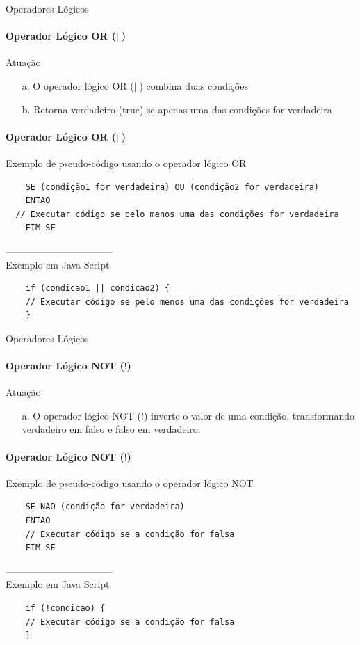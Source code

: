 \documentclass[13pt, xcolor={dvipsnames,svgnames}, portuguese]{beamer}
\begin{document}
\begin{frame}{Operadores Lógicos}
\framesubtitle{Operador Lógico OR ($||$)}
	\begin{block}{Atuação}
		\begin{itemize}
		  \item[a. ] O operador lógico OR ($||$) combina duas condições 
		  \pause
		  \item[b. ] Retorna verdadeiro (true) se apenas uma das condições for verdadeira
		\end{itemize}
	\end{block}	
\end{frame}

\begin{frame}[fragile]
\framesubtitle{Operador Lógico OR ($||$)}
 Exemplo de pseudo-código usando o operador lógico OR
	\begin{verbatim}
	SE (condição1 for verdadeira) OU (condição2 for verdadeira)
	ENTAO
  // Executar código se pelo menos uma das condições for verdadeira
	FIM SE
	\end{verbatim}
	---------------------------------\\
	Exemplo em Java Script
	\begin{verbatim}
	if (condicao1 || condicao2) {
  	// Executar código se pelo menos uma das condições for verdadeira
	}
	\end{verbatim}
\end{frame}

\begin{frame}{Operadores Lógicos}
\framesubtitle{Operador Lógico NOT ($!$)}
	\begin{block}{Atuação}
		\begin{itemize}
		  \item[a. ] O operador lógico NOT ($!$) inverte o valor de uma condição, transformando verdadeiro em falso e falso em verdadeiro. 
		\end{itemize}
	\end{block}	
\end{frame}

\begin{frame}[fragile]
\framesubtitle{Operador Lógico NOT ($!$)}
 Exemplo de pseudo-código usando o operador lógico NOT
	\begin{verbatim}
	SE NAO (condição for verdadeira)
	ENTAO
  	// Executar código se a condição for falsa
	FIM SE
	\end{verbatim}
	---------------------------------\\
	Exemplo em Java Script
	\begin{verbatim}
	if (!condicao) {
  	// Executar código se a condição for falsa
	}
	\end{verbatim}
\end{frame}
\end{document}
